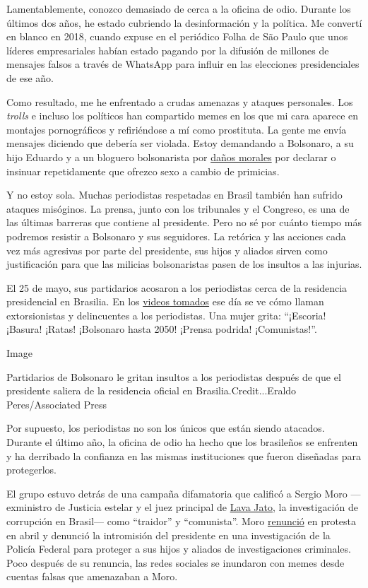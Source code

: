 Lamentablemente, conozco demasiado de cerca a la oficina de odio.
Durante los últimos dos años, he estado cubriendo la desinformación y la
política. Me convertí en blanco en 2018, cuando expuse en el periódico
Folha de São Paulo que unos líderes empresariales habían estado pagando
por la difusión de millones de mensajes falsos a través de WhatsApp para
influir en las elecciones presidenciales de ese año.

Como resultado, me he enfrentado a crudas amenazas y ataques personales.
Los \emph{trolls} e incluso los políticos han compartido memes en los
que mi cara aparece en montajes pornográficos y refiriéndose a mí como
prostituta. La gente me envía mensajes diciendo que debería ser violada.
Estoy demandando a Bolsonaro, a su hijo Eduardo y a un bloguero
bolsonarista por
\href{http://www.fundamedios.us/incidentes/patriciacampos-demanda-jairbolsonaro-ofensas-periodista/}{daños
morales} por declarar o insinuar repetidamente que ofrezco sexo a cambio
de primicias.

Y no estoy sola. Muchas periodistas respetadas en Brasil también han
sufrido ataques misóginos. La prensa, junto con los tribunales y el
Congreso, es una de las últimas barreras que contiene al presidente.
Pero no sé por cuánto tiempo más podremos resistir a Bolsonaro y sus
seguidores. La retórica y las acciones cada vez más agresivas por parte
del presidente, sus hijos y aliados sirven como justificación para que
las milicias bolsonaristas pasen de los insultos a las injurias.

El 25 de mayo, sus partidarios acosaron a los periodistas cerca de la
residencia presidencial en Brasilia. En los
\href{https://twitter.com/folha/status/1264913877399212034}{videos
tomados} ese día se ve cómo llaman extorsionistas y delincuentes a los
periodistas. Una mujer grita: ``¡Escoria! ¡Basura! ¡Ratas! ¡Bolsonaro
hasta 2050! ¡Prensa podrida! ¡Comunistas!''.

Image

Partidarios de Bolsonaro le gritan insultos a los periodistas después de
que el presidente saliera de la residencia oficial en
Brasilia.Credit...Eraldo Peres/Associated Press

Por supuesto, los periodistas no son los únicos que están siendo
atacados. Durante el último año, la oficina de odio ha hecho que los
brasileños se enfrenten y ha derribado la confianza en las mismas
instituciones que fueron diseñadas para protegerlos.

El grupo estuvo detrás de una campaña difamatoria que calificó a Sergio
Moro ---exministro de Justicia estelar y el juez principal de
\href{https://www.nytimes.com/2017/09/18/opinion/brazil-corruption-car-wash.html?searchResultPosition=1}{Lava
Jato}, la investigación de corrupción en Brasil--- como ``traidor'' y
``comunista''. Moro
\href{https://www.nytimes.com/2020/04/24/world/americas/brazil-bolsonaro-moro.html}{renunció}
en protesta en abril y denunció la intromisión del presidente en una
investigación de la Policía Federal para proteger a sus hijos y aliados
de investigaciones criminales. Poco después de su renuncia, las redes
sociales se inundaron con memes desde cuentas falsas que amenazaban a
Moro.

